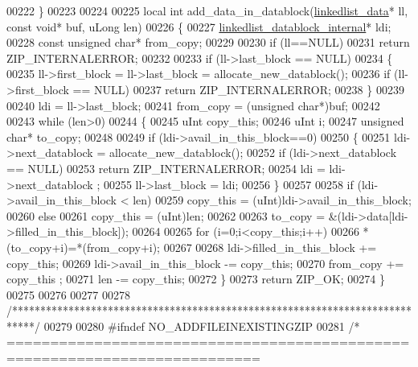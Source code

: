 \begin{DoxyCode}
00222 \}
00223 
00224 
00225 local \textcolor{keywordtype}{int} add\_data\_in\_datablock(\hyperlink{structlinkedlist__data__s}{linkedlist\_data}* ll, \textcolor{keyword}{const} \textcolor{keywordtype}{void}* buf, uLong len)
00226 \{
00227     \hyperlink{structlinkedlist__datablock__internal__s}{linkedlist\_datablock\_internal}* ldi;
00228     \textcolor{keyword}{const} \textcolor{keywordtype}{unsigned} \textcolor{keywordtype}{char}* from\_copy;
00229 
00230     \textcolor{keywordflow}{if} (ll==NULL)
00231         \textcolor{keywordflow}{return} ZIP\_INTERNALERROR;
00232 
00233     \textcolor{keywordflow}{if} (ll->last\_block == NULL)
00234     \{
00235         ll->first\_block = ll->last\_block = allocate\_new\_datablock();
00236         \textcolor{keywordflow}{if} (ll->first\_block == NULL)
00237             \textcolor{keywordflow}{return} ZIP\_INTERNALERROR;
00238     \}
00239 
00240     ldi = ll->last\_block;
00241     from\_copy = (\textcolor{keywordtype}{unsigned} \textcolor{keywordtype}{char}*)buf;
00242 
00243     \textcolor{keywordflow}{while} (len>0)
00244     \{
00245         uInt copy\_this;
00246         uInt i;
00247         \textcolor{keywordtype}{unsigned} \textcolor{keywordtype}{char}* to\_copy;
00248 
00249         \textcolor{keywordflow}{if} (ldi->avail\_in\_this\_block==0)
00250         \{
00251             ldi->next\_datablock = allocate\_new\_datablock();
00252             \textcolor{keywordflow}{if} (ldi->next\_datablock == NULL)
00253                 \textcolor{keywordflow}{return} ZIP\_INTERNALERROR;
00254             ldi = ldi->next\_datablock ;
00255             ll->last\_block = ldi;
00256         \}
00257 
00258         \textcolor{keywordflow}{if} (ldi->avail\_in\_this\_block < len)
00259             copy\_this = (uInt)ldi->avail\_in\_this\_block;
00260         \textcolor{keywordflow}{else}
00261             copy\_this = (uInt)len;
00262 
00263         to\_copy = &(ldi->data[ldi->filled\_in\_this\_block]);
00264 
00265         \textcolor{keywordflow}{for} (i=0;i<copy\_this;i++)
00266             *(to\_copy+i)=*(from\_copy+i);
00267 
00268         ldi->filled\_in\_this\_block += copy\_this;
00269         ldi->avail\_in\_this\_block -= copy\_this;
00270         from\_copy += copy\_this ;
00271         len -= copy\_this;
00272     \}
00273     \textcolor{keywordflow}{return} ZIP\_OK;
00274 \}
00275 
00276 
00277 
00278 \textcolor{comment}{/****************************************************************************/}
00279 
00280 \textcolor{preprocessor}{#ifndef NO\_ADDFILEINEXISTINGZIP}
00281 \textcolor{comment}{/* ===========================================================================}

\end{DoxyCode}
